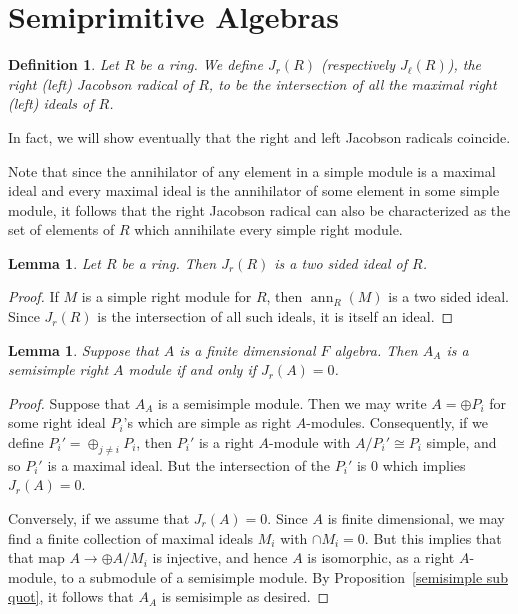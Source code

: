 \documentclass[12pt]{report}
\theoremstyle{plain}
\newtheorem{defn}[thm]{Definition}
\newtheorem{lem}[thm]{Lemma}
\newcommand{\oper}[1]{\operatorname{#1}}
\newcommand{\ann}{\oper{ann}}
\begin{document}
\section{Semiprimitive Algebras}

\begin{defn}
Let $R$ be a ring. We define $J_r(R)$ (respectively $J_\ell(R)$), the right
(left) Jacobson radical of $R$, to be the intersection of all the maximal
right (left) ideals of $R$. 
\end{defn}
In fact, we will show eventually that the right and left Jacobson radicals
coincide.

Note that since the annihilator of any element in a simple module is a
maximal ideal and every maximal ideal is the annihilator of some element in
some simple module, it follows that the right Jacobson radical can also be
characterized as the set of elements of $R$ which annihilate every simple
right module.

\begin{lem}
Let $R$ be a ring. Then $J_r(R)$ is a two sided ideal of $R$.
\end{lem}
\begin{proof}
If $M$ is a simple right module for $R$, then $\ann_R(M)$ is a two sided
ideal. Since $J_r(R)$ is the intersection of all such ideals, it is itself
an ideal.
\end{proof}

\begin{lem}
Suppose that $A$ is a finite dimensional $F$ algebra. Then $A_A$ is a
semisimple right $A$ module if and only if $J_r(A) = 0$.
\end{lem}
\begin{proof}
Suppose that $A_A$ is a semisimple module. Then we may write $A = \oplus
P_i$ for some right ideal $P_i$'s which are simple as right $A$-modules.
Consequently, if we define $P_i' = \oplus_{j \neq i} P_i$, then $P_i'$ is a
right $A$-module with $A/P_i' \cong P_i$ simple, and so $P_i'$ is a maximal
ideal. But the intersection of the $P_i'$ is $0$ which implies $J_r(A) =
0$.

Conversely, if we assume that $J_r(A) = 0$. Since $A$ is finite
dimensional, we may find a finite collection of maximal ideals $M_i$ with
$\cap M_i = 0$. But this implies that that map $A \to \oplus A/M_i$ is
injective, and hence $A$ is isomorphic, as a right $A$-module, to a
submodule of a semisimple module. By Proposition~\ref{semisimple sub quot},
it follows that $A_A$ is semisimple as desired. 
\end{proof}
\end{document}
